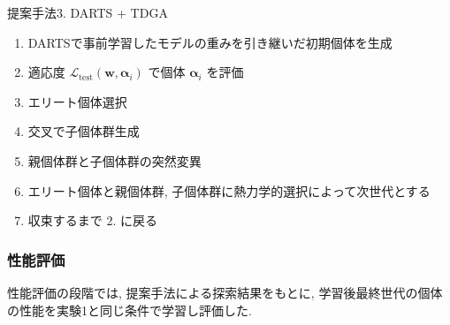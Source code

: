 \begin{algorithm}[tb]
  \caption{提案手法3. DARTS + TDGA}
  \label{alg3}
  \begin{enumerate}
    \item DARTSで事前学習したモデルの重みを引き継いだ初期個体を生成
    \item 適応度 $\displaystyle \mathcal{L}_{\mathrm{test}}(\bm{w}, \bm{\alpha}_i)$ で個体 $\bm{\alpha}_i$ を評価
    \item エリート個体選択
    \item 交叉で子個体群生成
    \item 親個体群と子個体群の突然変異
    \item エリート個体と親個体群, 子個体群に熱力学的選択によって次世代とする
    \item 収束するまで 2. に戻る
  \end{enumerate}
\end{algorithm}




\subsubsection{性能評価}

性能評価の段階では, 提案手法による探索結果をもとに,
学習後最終世代の個体の性能を実験1と同じ条件で学習し評価した.
